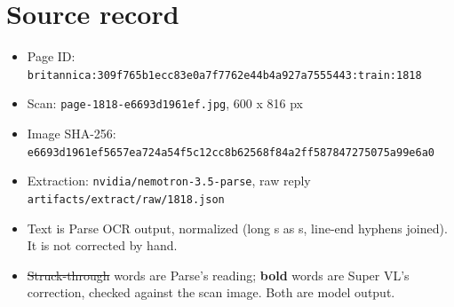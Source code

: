 \documentclass[10pt]{article}
\begin{document}
\section*{Source record}
\begin{itemize}
\item Page ID: \texttt{britannica:309f765b1ecc83e0a7f7762e44b4a927a7555443:train:1818}
\item Scan: \texttt{page-1818-e6693d1961ef.jpg}, 600 x 816 px
\item Image SHA-256: \texttt{\small e6693d1961ef5657ea724a54f5c12cc8b62568f84a2ff587847275075a99e6a0}
\item Extraction: \texttt{nvidia/nemotron-3.5-parse}, raw reply \texttt{artifacts/extract/raw/1818.json}
\item Text is Parse OCR output, normalized (long s as s, line-end hyphens joined). It is not corrected by hand.
\item \sout{Struck-through} words are Parse's reading; \textbf{bold} words are Super VL's correction, checked against the scan image. Both are model output.
\end{itemize}
\end{document}

